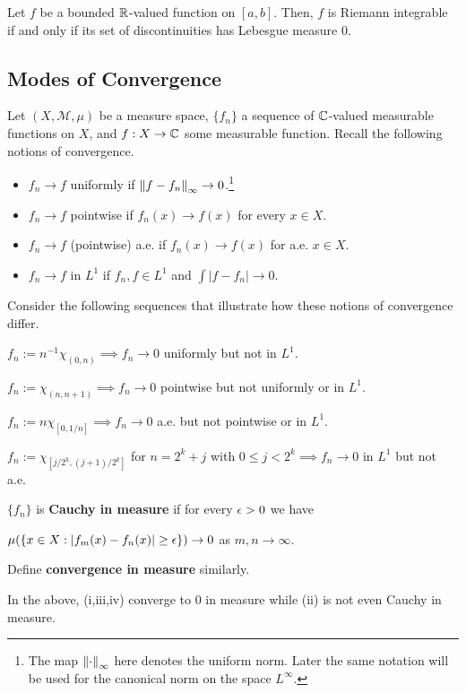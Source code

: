 \documentclass[11pt]{article}
\newcommand{\M}{\mathcal{M}}
\begin{document}
\begin{theorem}
Let $f$ be a bounded $\mathbb{R}$-valued function on $[a,b]$. Then, $f$ is Riemann integrable if and only if its set of discontinuities has Lebesgue measure $0$.
\end{theorem}

\subsection{Modes of Convergence}
Let $(X,\M,\mu)$ be a measure space, $\{f_n\}$ a sequence of $\mathbb{C}$-valued measurable functions on $X$, and $f: X\to\mathbb{C}$ some measurable function. Recall the following notions of convergence.
\begin{itemize}
\item $f_n\to f$ uniformly if $\left\lVert f-f_n\right\rVert_{\infty}\to0$.\footnote{The map $\left\lVert\cdot\right\rVert_{\infty}$ here denotes the uniform norm. Later the same notation will be used for the canonical norm on the space $L^{\infty}$.}
\item $f_n\to f$ pointwise if $f_n(x)\to f(x)$ for every $x\in X$.
\item $f_n\to f$ (pointwise) a.e. if $f_n(x)\to f(x)$ for a.e. $x\in X$.
\item $f_n\to f$ in $L^1$ if $f_n,f\in L^1$ and $\int|f-f_n|\to0$.
\end{itemize}
Consider the following sequences that illustrate how these notions of convergence differ.
\begin{enum}{\roman}
\item $f_n:=n^{-1}\chi_{(0,n)}\implies f_n\to0$ uniformly but not in $L^1$. 
\item $f_n:=\chi_{(n,n+1)}\implies f_n\to0$ pointwise but not uniformly or in $L^1$.
\item $f_n:=n\chi_{[0,1/n]}\implies f_n\to0$ a.e. but not pointwise or in $L^1$.
\item $f_n:=\chi_{[j/2^k,(j+1)/2^k]}$ for $n=2^k+j$ with $0\leq j<2^k\implies f_n\to0$ in $L^1$ but not a.e.
\end{enum}

\begin{definition}
$\{f_n\}$ is \textbf{Cauchy in measure} if for every $\epsilon>0$ we have 
\begin{center}
$\mu(\{x\in X : |f_m(x)-f_n(x)|\geq\epsilon\})\to0$ as $m,n\to\infty$.
\end{center}
Define \textbf{convergence in measure} similarly.
\end{definition}

In the above, \textup{(i,iii,iv)} converge to $0$ in measure while \textup{(ii)} is not even Cauchy in measure. 
\end{document}
